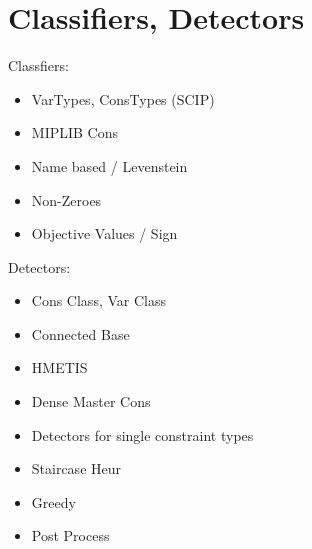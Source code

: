 \section{Classifiers, Detectors}

	Classfiers:
	\begin{itemize}
		\item VarTypes, ConsTypes (SCIP)
		\item MIPLIB Cons
		\item Name based / Levenstein
		\item Non-Zeroes
		\item Objective Values / Sign
	\end{itemize}

	Detectors:
	\begin{itemize}
		\item Cons Class, Var Class
		\item Connected Base
		\item HMETIS
		\item Dense Master Cons
		\item Detectors for single constraint types
		\item Staircase Heur
		\item Greedy
		\item Post Process
	\end{itemize}
